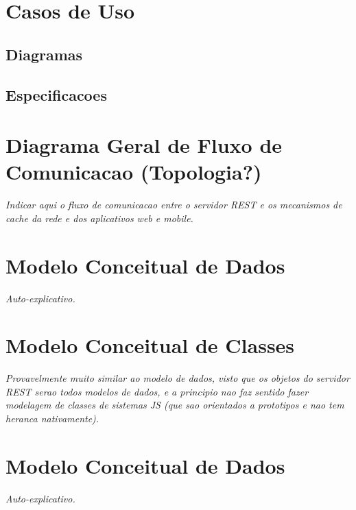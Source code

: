 \documentclass[a4paper,article]{abnt}
\begin{document}
\section{Casos de Uso}

\subsection{Diagramas}

\subsection{Especificacoes}

\section{Diagrama Geral de Fluxo de Comunicacao (Topologia?)}
\emph{Indicar aqui o fluxo de comunicacao entre o servidor REST e os mecanismos de cache da rede e dos aplicativos web e mobile.}

\section{Modelo Conceitual de Dados}
\emph{Auto-explicativo.}

\section{Modelo Conceitual de Classes}
\emph{Provavelmente muito similar ao modelo de dados, visto que os objetos do servidor REST serao todos modelos de dados, e a principio nao faz sentido fazer modelagem de classes de sistemas JS (que sao orientados a prototipos e nao tem heranca nativamente).}

\section{Modelo Conceitual de Dados}
\emph{Auto-explicativo.}
\end{document}

